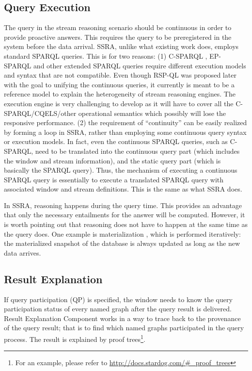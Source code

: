 \subsection{Query Execution}
The query in the stream reasoning scenario should be continuous in order to provide proactive answers. 
This requires the query to be preregistered in the system before the data arrival.
SSRA, unlike what existing work does, employs standard SPARQL queries.
This is for two reasons:
(1) C-SPARQL \cite{barbieri2009c}, EP-SPARQL \cite{anicic2011ep} and other extended SPARQL queries require different execution models and syntax that are not compatible.
Even though RSP-QL \cite{dell2014rsp} was proposed later with the goal to unifying the continuous queries, it currently is meant to be a reference model to explain the heterogeneity of stream reasoning engines. 
The execution engine is very challenging to develop as it will have to cover all the C-SPARQL/CQELS/other operational semantics which possibly will lose the responsive performance.
(2) the requirement of ``continuity'' can be easily realized by forming a loop in SSRA, rather than employing some continuous query syntax or execution models. 
In fact, even the continuous SPARQL queries, such as C-SPARQL, need to be translated into the continuous query part (which includes the window and stream information), and the static query part (which is basically the SPARQL query).
Thus, the mechanism of executing a continuous SPARQL query is essentially to execute a translated SPARQL query with associated window and stream definitions.
This is the same as what SSRA does. 

In SSRA, reasoning happens during the query time. 
This provides an advantage that only the necessary entailments for the answer will be computed. 
However, it is worth pointing out that reasoning does not have to happen at the same time as the query does. 
One example is materialization \cite{barbieri2010incremental},  which is performed iteratively: the materialized snapshot of the database is always updated as long as the new data arrives. 
%
\subsection{Result Explanation}
If query participation (QP) is specified, the window needs to know the query participation status of every named graph after the query result is delivered.
Result Explanation Component works in a way to trace back to the provenance of the query result; that is to find which named graphs participated in the query process. 
The result is explained by proof trees\footnote{For an example, please refer to \url{http://docs.stardog.com/\#\_proof\_trees}}.

